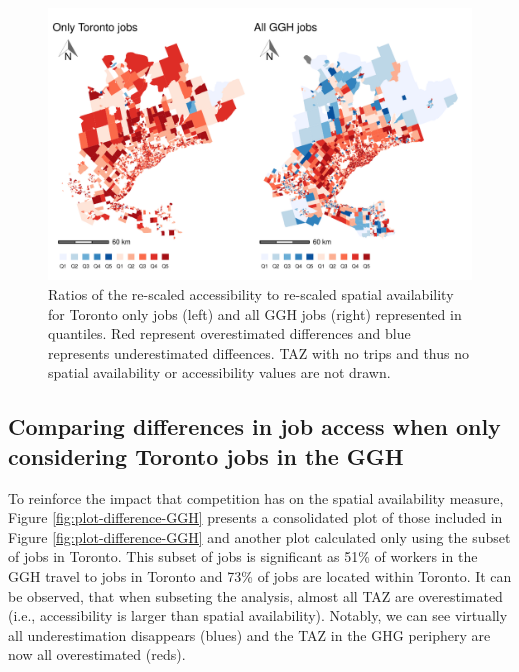 \documentclass[]{elsarticle} %
\begin{document}
\begin{figure}
\includegraphics[width=1\linewidth]{Spatial-Availability_files/figure-latex/plot-diff-Toronto-vs-GGH-1} \caption{\label{fig:plot-diff-Toronto-vs-GGH}Ratios of the re-scaled accessibility to re-scaled spatial availability for Toronto only jobs (left) and all GGH jobs (right) represented in quantiles. Red represent overestimated differences and blue represents underestimated diffeences. TAZ with no trips and thus no spatial availability or accessibility values are not drawn.}\label{fig:plot-diff-Toronto-vs-GGH}
\end{figure}

\hypertarget{comparing-differences-in-job-access-when-only-considering-toronto-jobs-in-the-ggh}{%
\subsection{Comparing differences in job access when only considering
Toronto jobs in the
GGH}\label{comparing-differences-in-job-access-when-only-considering-toronto-jobs-in-the-ggh}}

To reinforce the impact that competition has on the spatial availability
measure, Figure \ref{fig:plot-difference-GGH} presents a consolidated
plot of those included in Figure \ref{fig:plot-difference-GGH} and
another plot calculated only using the subset of jobs in Toronto. This
subset of jobs is significant as 51\% of workers in the GGH travel to
jobs in Toronto and 73\% of jobs are located within Toronto. It can be
observed, that when subseting the analysis, almost all TAZ are
overestimated (i.e., accessibility is larger than spatial availability).
Notably, we can see virtually all underestimation disappears (blues) and
the TAZ in the GHG periphery are now all overestimated (reds).
\end{document}

